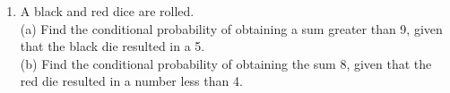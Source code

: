 \begin{enumerate}[label=\thechapter.\arabic*,ref=\thechapter.\theenumi]
\item  A black and red dice are rolled.\\
 (a) Find the conditional probability of obtaining a sum greater than 9, given that the black die resulted in a 5.\\
 (b) Find the conditional probability of obtaining  the sum 8, given that the red die resulted in a number less than 4.
\end{enumerate}